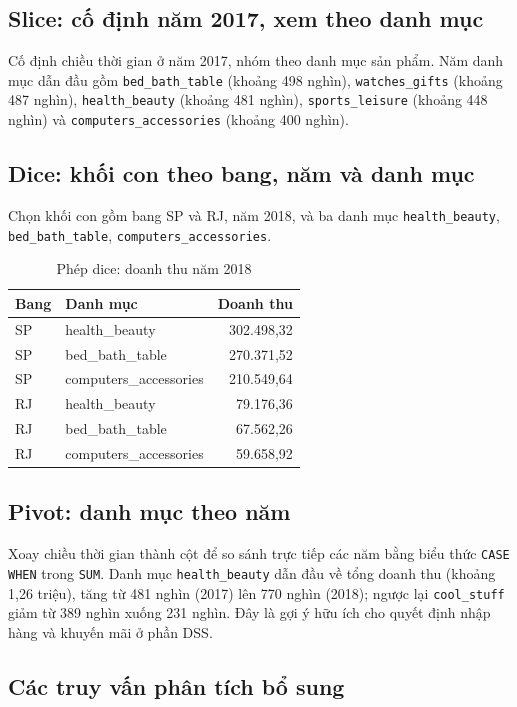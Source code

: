 \documentclass[12pt,a4paper]{article}
\newcommand{\code}[1]{\texttt{\small #1}}
\begin{document}
\subsection{Slice: cố định năm 2017, xem theo danh mục}
Cố định chiều thời gian ở năm 2017, nhóm theo danh mục sản phẩm. Năm danh mục dẫn đầu gồm
\code{bed\_bath\_table} (khoảng 498 nghìn), \code{watches\_gifts} (khoảng 487 nghìn), \code{health\_beauty}
(khoảng 481 nghìn), \code{sports\_leisure} (khoảng 448 nghìn) và \code{computers\_accessories} (khoảng 400 nghìn).

\subsection{Dice: khối con theo bang, năm và danh mục}
Chọn khối con gồm bang SP và RJ, năm 2018, và ba danh mục \code{health\_beauty}, \code{bed\_bath\_table},
\code{computers\_accessories}.

\begin{table}[h]
\centering
\caption{Phép dice: doanh thu năm 2018}
\small
\begin{tabular}{@{}l l r@{}}
\toprule
\textbf{Bang} & \textbf{Danh mục} & \textbf{Doanh thu}\\
\midrule
SP & health\_beauty & 302.498,32\\
SP & bed\_bath\_table & 270.371,52\\
SP & computers\_accessories & 210.549,64\\
RJ & health\_beauty & 79.176,36\\
RJ & bed\_bath\_table & 67.562,26\\
RJ & computers\_accessories & 59.658,92\\
\bottomrule
\end{tabular}
\end{table}

\subsection{Pivot: danh mục theo năm}
Xoay chiều thời gian thành cột để so sánh trực tiếp các năm bằng biểu thức \code{CASE WHEN} trong
\code{SUM}. Danh mục \code{health\_beauty} dẫn đầu về tổng doanh thu (khoảng 1,26 triệu), tăng từ 481 nghìn
(2017) lên 770 nghìn (2018); ngược lại \code{cool\_stuff} giảm từ 389 nghìn xuống 231 nghìn.
Đây là gợi ý hữu ích cho quyết định nhập hàng và khuyến mãi ở phần DSS.

\subsection{Các truy vấn phân tích bổ sung}
\end{document}
